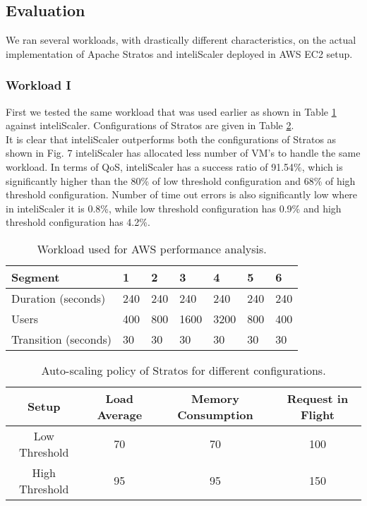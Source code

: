 \subsection{Evaluation}

We ran several workloads, with drastically different characteristics, on the actual implementation of Apache Stratos and inteliScaler deployed in AWS EC2 setup.

\subsubsection{Workload I}
First we tested the same workload that was used earlier as shown in Table \ref{table:analysis_workload} against inteliScaler. Configurations of Stratos are given in Table \ref{table:policy_threshold}.\\

It is clear that inteliScaler outperforms both the configurations of Stratos as shown in Fig. 7 inteliScaler has allocated less number of VM's to handle the same workload. In terms of QoS, inteliScaler has a success ratio of 91.54\%, which is significantly higher than the 80\% of low threshold configuration and 68\% of high threshold configuration. Number of time out errors is also significantly low where in inteliScaler it is 0.8\%, while low threshold configuration has 0.9\% and high threshold configuration has 4.2\%.\\

\begin{table}[h!]
\centering
\caption{Workload used for AWS performance analysis.}
\label{table:analysis_workload}
\begin{tabular}{|l|l|l|l|l|l|l|}
\hline
Segment & 1 & 2 & 3 & 4 & 5 & 6\\ \hline
Duration (seconds) & 240 & 240 & 240 & 240 & 240 & 240 \\ \hline
Users & 400 & 800 & 1600 & 3200 & 800 & 400 \\ \hline
Transition (seconds) & 30 & 30 & 30 & 30 & 30 & 30 \\ \hline
\end{tabular}
\end{table}

\begin{table}[h!]
\centering
\caption{Auto-scaling policy of Stratos for different configurations.}
\label{table:policy_threshold}
\begin{tabular}{|c|c|c|c|}
\hline
Setup & Load Average & Memory Consumption & Request in Flight \\ \hline
Low Threshold & 70 & 70 & 100\\ \hline
High Threshold & 95 & 95 & 150\\ \hline
\end{tabular}
\end{table}
